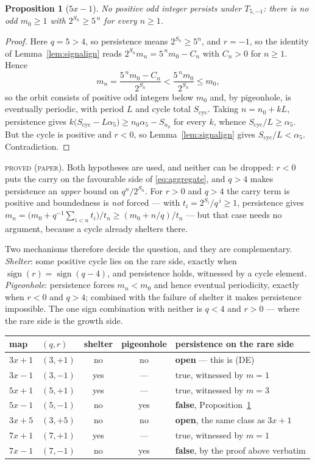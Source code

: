 \documentclass[11pt,reqno]{amsart}
\theoremstyle{plain}
\newtheorem{proposition}[theorem]{Proposition}
\theoremstyle{definition}
\newcommand{\lab}[1]{\textnormal{\textsc{\small #1}}}
\begin{document}
\begin{proposition}[$5x-1$]\label{prop:5m1}
No positive odd integer persists under $T_{5,-1}$: there is no odd $m_0\ge1$ with
$2^{S_n}\ge5^{\,n}$ for every $n\ge1$.
\end{proposition}

\begin{proof}
Here $q=5>4$, so persistence means $2^{S_n}\ge5^n$, and $r=-1$, so the identity of
Lemma~\ref{lem:signalign} reads $2^{S_n}m_n=5^{\,n}m_0-C_n$ with $C_n>0$ for $n\ge1$.
Hence
\[
m_n=\frac{5^{\,n}m_0-C_n}{2^{S_n}}<\frac{5^{\,n}m_0}{2^{S_n}}\le m_0 ,
\]
so the orbit consists of positive odd integers below $m_0$ and, by pigeonhole, is
eventually periodic, with period $L$ and cycle total $S_{\mathrm{cyc}}$. Taking
$n=n_0+kL$, persistence gives
$k\bigl(S_{\mathrm{cyc}}-L\alpha_5\bigr)\ge n_0\alpha_5-S_{n_0}$ for every $k$,
whence $S_{\mathrm{cyc}}/L\ge\alpha_5$. But the cycle is positive and $r<0$, so
Lemma~\ref{lem:signalign} gives $S_{\mathrm{cyc}}/L<\alpha_5$. Contradiction.
\end{proof}
\lab{proved (paper)}. Both hypotheses are used, and neither can be dropped: $r<0$
puts the carry on the favourable side of \eqref{eq:aggregate}, and $q>4$ makes
persistence an \emph{upper} bound on $q^n/2^{S_n}$. For $r>0$ and $q>4$ the carry
term is positive and boundedness is \emph{not} forced --- with $t_i=2^{S_i}/q^{\,i}\ge1$,
persistence gives $m_n=\bigl(m_0+q^{-1}\sum_{i<n}t_i\bigr)/t_n\ge(m_0+n/q)/t_n$ ---
but that case needs no argument, because a cycle already shelters there.

Two mechanisms therefore decide the question, and they are complementary.
\emph{Shelter}: some positive cycle lies on the rare side, exactly when
$\operatorname{sign}(r)=\operatorname{sign}(q-4)$, and persistence holds, witnessed by
a cycle element. \emph{Pigeonhole}: persistence forces $m_n<m_0$ and hence eventual
periodicity, exactly when $r<0$ and $q>4$; combined with the failure of shelter it
makes persistence impossible. The one sign combination with neither is $q<4$ and
$r>0$ --- where the rare side is the growth side.

\begin{center}\small
\begin{tabular}{@{}llccl@{}}
\toprule
map & $(q,r)$ & shelter & pigeonhole & persistence on the rare side\\
\midrule
$3x+1$ & $(3,+1)$ & no  & no  & \textbf{open} --- this is \textup{(DE)}\\
$3x-1$ & $(3,-1)$ & yes & --- & true, witnessed by $m=1$\\
$5x+1$ & $(5,+1)$ & yes & --- & true, witnessed by $m=3$\\
$5x-1$ & $(5,-1)$ & no  & yes & \textbf{false}, Proposition~\ref{prop:5m1}\\
$3x+5$ & $(3,+5)$ & no  & no  & \textbf{open}, the same class as $3x+1$\\
$7x+1$ & $(7,+1)$ & yes & --- & true, witnessed by $m=1$\\
$7x-1$ & $(7,-1)$ & no  & yes & \textbf{false}, by the proof above verbatim\\
\bottomrule
\end{tabular}
\end{center}
\end{document}
